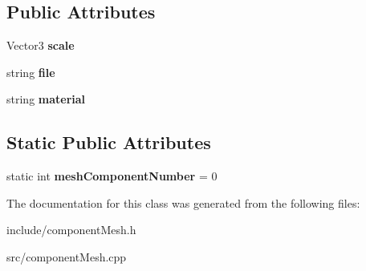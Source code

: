 \subsection*{\-Public \-Attributes}
\begin{DoxyCompactItemize}
\item 
\hypertarget{classComponentTemplateMesh_aac9f15987d6acd60a4dd8176608bd25b}{
\-Vector3 {\bfseries scale}}
\label{d5/d29/classComponentTemplateMesh_aac9f15987d6acd60a4dd8176608bd25b}

\item 
\hypertarget{classComponentTemplateMesh_a7b1d66715e48b883b1433edaf4c82aed}{
string {\bfseries file}}
\label{d5/d29/classComponentTemplateMesh_a7b1d66715e48b883b1433edaf4c82aed}

\item 
\hypertarget{classComponentTemplateMesh_a9fb2b5428371d025de9d832d8c7af3a2}{
string {\bfseries material}}
\label{d5/d29/classComponentTemplateMesh_a9fb2b5428371d025de9d832d8c7af3a2}

\end{DoxyCompactItemize}
\subsection*{\-Static \-Public \-Attributes}
\begin{DoxyCompactItemize}
\item 
\hypertarget{classComponentTemplateMesh_a009895eaa7cbfb0856c1e680e69b2d89}{
static int {\bfseries mesh\-Component\-Number} = 0}
\label{d5/d29/classComponentTemplateMesh_a009895eaa7cbfb0856c1e680e69b2d89}

\end{DoxyCompactItemize}


\-The documentation for this class was generated from the following files\-:\begin{DoxyCompactItemize}
\item 
include/component\-Mesh.\-h\item 
src/component\-Mesh.\-cpp\end{DoxyCompactItemize}
